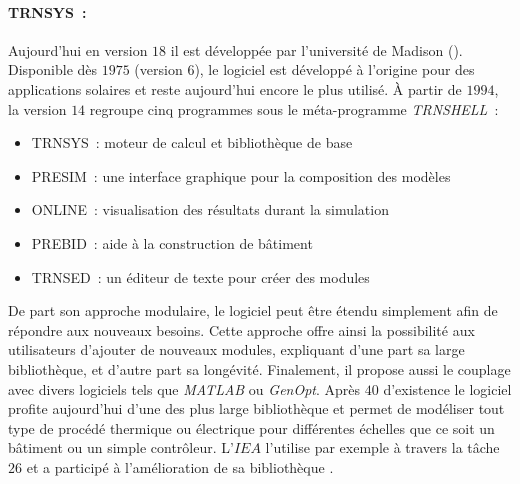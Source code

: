\paragraph{TRNSYS~:} %
\label{par:trnssys}
Aujourd’hui en version $18$ \parencite{Klein2017} il est développée par l’université de Madison ().
Disponible dès $1975$ (version $6$), le logiciel est développé à l’origine pour des applications
solaires et reste aujourd’hui encore le plus utilisé. À partir de $1994$, la version
$14$ regroupe cinq programmes sous le méta-programme \textit{TRNSHELL}~:
\begin{itemize}
    \item TRNSYS~: moteur de calcul et bibliothèque de base
    \item PRESIM~: une interface graphique pour la composition des modèles
    \item ONLINE~: visualisation des résultats durant la simulation
    \item PREBID~: aide à la construction de bâtiment
    \item TRNSED~: un éditeur de texte pour créer des modules
\end{itemize}
De part son approche modulaire, le logiciel peut être étendu simplement afin de répondre aux
nouveaux besoins. Cette approche offre ainsi la possibilité aux utilisateurs
d’ajouter de nouveaux modules, expliquant d’une part sa large bibliothèque, et d’autre part
sa longévité. Finalement, il propose aussi le couplage avec divers logiciels tels que
\textit{MATLAB} ou \textit{GenOpt}. Après $40$ d’existence le logiciel profite aujourd’hui
d’une des plus large bibliothèque et permet de modéliser tout type de procédé thermique ou
électrique pour différentes échelles que ce soit un bâtiment ou un simple contrôleur.
L’$IEA$ l’utilise par exemple à travers la tâche $26$ et a participé à l’amélioration de
sa bibliothèque \parencite{Task26B2002}.

